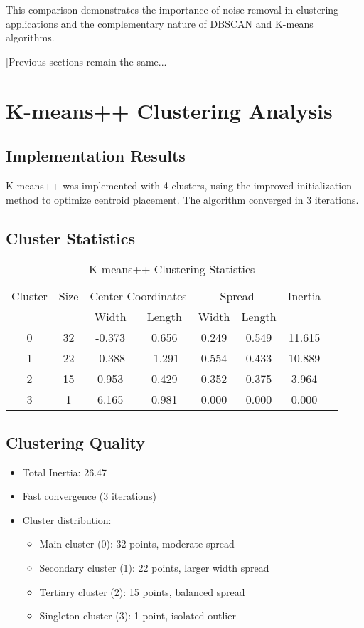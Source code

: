 \documentclass[12pt]{article}
\begin{document}
This comparison demonstrates the importance of noise removal in clustering applications and the complementary nature of DBSCAN and K-means algorithms.

[Previous sections remain the same...]

\section{K-means++ Clustering Analysis}

\subsection{Implementation Results}
K-means++ was implemented with 4 clusters, using the improved initialization method to optimize centroid placement. The algorithm converged in 3 iterations.

\subsection{Cluster Statistics}
\begin{table}[H]
\centering
\begin{tabular}{cccccccc}
\toprule
Cluster & Size & \multicolumn{2}{c}{Center Coordinates} & \multicolumn{2}{c}{Spread} & Inertia \\
\cmidrule(lr){3-4} \cmidrule(lr){5-6}
& & Width & Length & Width & Length & \\
\midrule
0 & 32 & -0.373 & 0.656 & 0.249 & 0.549 & 11.615 \\
1 & 22 & -0.388 & -1.291 & 0.554 & 0.433 & 10.889 \\
2 & 15 & 0.953 & 0.429 & 0.352 & 0.375 & 3.964 \\
3 & 1 & 6.165 & 0.981 & 0.000 & 0.000 & 0.000 \\
\bottomrule
\end{tabular}
\caption{K-means++ Clustering Statistics}
\end{table}

\subsection{Clustering Quality}
\begin{itemize}
    \item Total Inertia: 26.47
    \item Fast convergence (3 iterations)
    \item Cluster distribution:
    \begin{itemize}
        \item Main cluster (0): 32 points, moderate spread
        \item Secondary cluster (1): 22 points, larger width spread
        \item Tertiary cluster (2): 15 points, balanced spread
        \item Singleton cluster (3): 1 point, isolated outlier
    \end{itemize}
\end{itemize}
\end{document}
